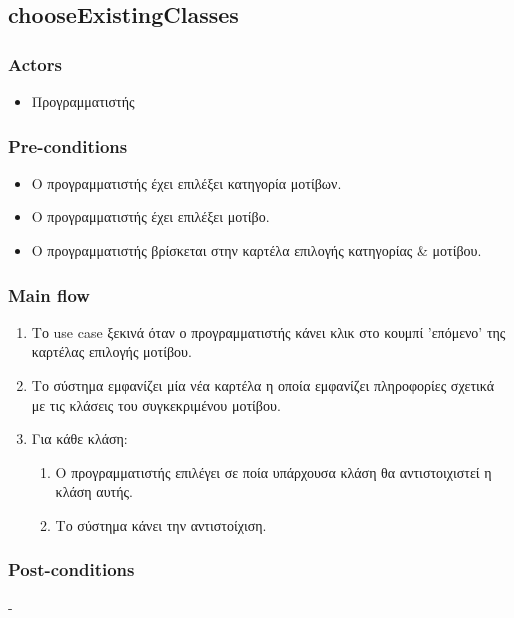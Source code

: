 \documentclass[../diploma_thesis.tex]{subfiles}
\begin{document}
\subsection{chooseExistingClasses}
\subsubsection{Actors}
\begin{itemize}
\item  Προγραμματιστής
\end{itemize}
\subsubsection{Pre-conditions}
\begin{itemize}
\item Ο προγραμματιστής έχει επιλέξει κατηγορία μοτίβων.
\item  Ο προγραμματιστής έχει επιλέξει μοτίβο.
\item Ο προγραμματιστής βρίσκεται στην καρτέλα επιλογής κατηγορίας \& μοτίβου.
\end{itemize}
\subsubsection{Main flow}
\begin{enumerate}
\item Το use case ξεκινά όταν ο προγραμματιστής κάνει κλικ στο κουμπί 'επόμενο' της καρτέλας επιλογής μοτίβου.
\item Το σύστημα εμφανίζει μία νέα καρτέλα η οποία εμφανίζει πληροφορίες σχετικά με τις κλάσεις του συγκεκριμένου μοτίβου.
\item Για κάθε κλάση:\begin{enumerate}
\item Ο προγραμματιστής επιλέγει σε ποία υπάρχουσα κλάση θα αντιστοιχιστεί η κλάση αυτής.
\item Το σύστημα κάνει την αντιστοίχιση.
\end{enumerate}
\end{enumerate}
\subsubsection{Post-conditions}
-
\end{document}

